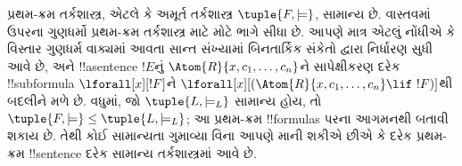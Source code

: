 \documentclass[../../../include/open-logic-section]{subfiles}
\begin{document}
\begin{rem}
  પ્રથમ-ક્રમ તર્કશાસ્ત્ર, એટલે કે અમૂર્ત તર્કશાસ્ત્ર
  $\tuple{F, \models}$, સામાન્ય છે. વાસ્તવમાં ઉપરના ગુણધર્મો
  પ્રથમ-ક્રમ તર્કશાસ્ત્ર માટે મોટે ભાગે સીધા છે. આપણે માત્ર એટલું
  નોંધીએ કે વિસ્તાર ગુણધર્મ વાક્યમાં આવતા સાન્ત સંખ્યામાં બિનતાર્કિક
  સંકેતો દ્વારા નિર્ધારણ સુધી આવે છે,
  અને !!a{sentence} $!E$નું $\Atom{R}{x, c_1, \dots, c_n}$ને
  સાપેક્ષીકરણ દરેક !!{subformula} $\lforall[x][!F]$ને
  $\lforall[x][(\Atom{R}{x, c_1, \dots, c_n} \lif \ !F)]$થી બદલીને
  મળે છે. વધુમાં, જો $\tuple{L, \models_L}$ સામાન્ય હોય, તો
  $\tuple{F, \models} \leq \tuple{L, \models_{L}}$; આ પ્રથમ-ક્રમ
  !!{formula}s પરના આગમનથી બતાવી શકાય છે. તેથી કોઈ સામાન્યતા ગુમાવ્યા
  વિના આપણે માની શકીએ છીએ કે દરેક પ્રથમ-ક્રમ !!{sentence} દરેક સામાન્ય
  તર્કશાસ્ત્રમાં આવે છે.
\end{rem}
\end{document}
